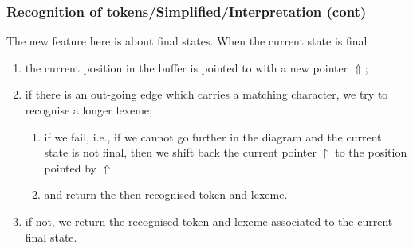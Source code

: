%
\begin{frame}
\frametitle{Recognition of tokens/Simplified/Interpretation (cont)}

The new feature here is about final states. When the current state is
final
\begin{enumerate}

  \item the current position in the buffer is pointed to with a new
  pointer \(\Uparrow\);

  \item if there is an out-going edge which carries a matching
  character, we try to recognise a longer lexeme;
  \begin{enumerate}

    \item if we fail, i.e., if we cannot go further in the diagram and
    the current state is not final, then we shift back the current
    pointer \(\upharpoonright\) to the position pointed
    by \(\Uparrow\)

    \item and return the then-recognised token and lexeme.

  \end{enumerate}

  \item if not, we return the recognised token and lexeme associated
  to the current final state.

\end{enumerate}

\end{frame}


